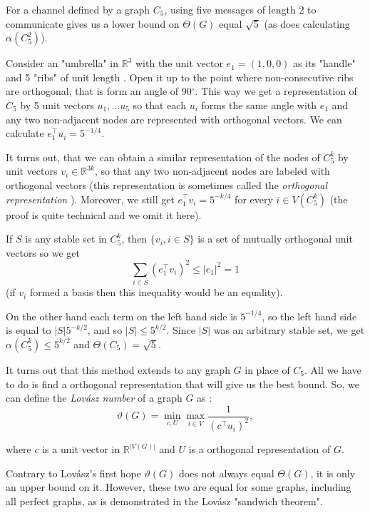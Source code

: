 For a channel defined by a graph $C_5$, using five messages of length 2 to communicate gives us a lower bound on $\Theta(G)$ equal $\sqrt{5}$ (as does calculating $\alpha(C_5^2)$).

Consider an "umbrella" in $\mathbb{R}^3$ with the unit vector $e_1 = (1, 0, 0)$ as its "handle" and 5 "ribs" of unit length . Open it up to the point where non-consecutive ribs are orthogonal, that is form an angle of 90$^\circ$. This way we get a representation of $C_5$ by 5 unit vectors $u_1, \ldots u_5$ so that each $u_i$ forms the same angle with $e_1$ and any two non-adjacent nodes are represented with orthogonal vectors. We can calculate $e_1^\intercal u_i = 5 ^ {-1/4}$.

It turns out, that we can obtain a similar representation of the nodes of $C_5^k$ by unit vectors $v_i \in \mathbb{R}^{3k}$, so that any two non-adjacent nodes are labeled with orthogonal vectors (this representation is sometimes called the \emph{orthogonal representation} \cite{Lovsz1989Orthogonal}). Moreover, we still get $e_1^\intercal v_i = 5^{-k/4}$ for every $i \in V(C_5^k)$ (the proof is quite technical and we omit it here).

If $S$ is any stable set in $C_5^k$, then $\{v_i, i \in S\}$ is a set of mutually orthogonal unit vectors so we get 
$$\sum\limits_{i\in S}(e_1^\intercal v_i)^2 \leq |e_1|^2 = 1$$
(if $v_i$ formed a basis then this inequality would be an equality).

On the other hand each term on the left hand side is $5^{-1/4}$, so the left hand side is equal to $|S|5^{-k/2}$, and so $|S| \leq 5^{k/2}$. Since $|S|$ was an arbitrary stable set, we get $\alpha(C_5^k) \leq 5 ^{k/2}$ and $\Theta(C_5) = \sqrt{5}$.

It turns out that this method extends to any graph $G$ in place of $C_5$. All we have to do is find a orthogonal representation that will give us the best bound. So, we can define the \emph{Lovász number} of a graph $G$ as :
$$\vartheta(G) = \min\limits_{c,U} \max\limits_{i\in V} \frac{1}{(c^\intercal u_i)^2},$$

\noindent where $c$ is a unit vector in $\mathbb{R}^{|V(G)|}$ and $U$ is a orthogonal representation of $G$.

Contrary to Lovász's first hope \cite{Lovasz1979} $\vartheta(G)$ does not always equal $\Theta(G)$, it is only an upper bound on it. However, these two are equal for some graphs, including all perfect graphs, as is demonstrated in the Lovász "sandwich theorem".

